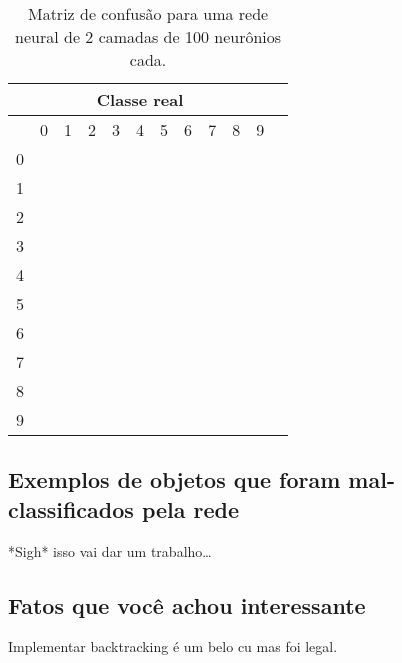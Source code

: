 \documentclass[twocolumn]{article}
\begin{document}
    \begin{table}
        \centering
        \begin{tabular}{cccccccccccc}
            \toprule
            \multicolumn{11}{c}{Classe real} \\
            \midrule
            {} & 0 & 1 & 2 & 3 & 4 & 5 & 6 & 7 & 8 & 9 \\
            0  & \\
            1  & \\
            2  & \\
            3  & \\
            4  & \\
            5  & \\
            6  & \\
            7  & \\
            8  & \\
            9  & \\
            \bottomrule
        \end{tabular}
        \caption{Matriz de confusão para uma rede neural de 2 camadas de 100
        neurônios cada.\label{conf-matrix}}
    \end{table}

    \subsection{Exemplos de objetos que foram mal-classificados pela rede}

    *Sigh* isso vai dar um trabalho\ldots

    \subsection{Fatos que você achou interessante}

    Implementar backtracking é um belo cu mas foi legal.

    
    
    \nocite{*}
\end{document}
